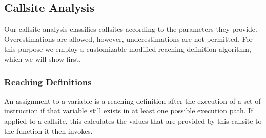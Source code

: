 % 

\subsection{Callsite Analysis}
\label{section:callsiteanalysis}
Our callsite analysis classifies callsites according to the parameters they provide. Overestimations are allowed, however,
underestimations are not permitted. For this purpose we employ a customizable modified reaching definition algorithm, 
which we will show first. 

\subsubsection{Reaching Definitions}
\label{subsection:reachindefinitionstheory}
An assignment to a variable is a reaching definition after the execution of a set of instruction if that variable still exists in at least one possible execution path. 
If applied to a callsite, this calculates the values that are provided by this callsite to the function it then invokes. 

